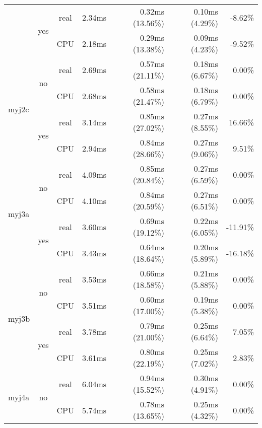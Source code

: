 \documentclass[en]{pracamgr}
\begin{document}
\begin{appendices}
\begin{small}
\begin{longtable}{|l|c|c|r|r|r|r|}
                          \cline{2-7}
                          & \multirow{2}{*}{yes} & real & 2.34ms & 0.32ms (13.56\%) & 0.10ms (4.29\%) & -8.62\% \\*
                          &                      & CPU  & 2.18ms & 0.29ms (13.38\%) & 0.09ms (4.23\%) & -9.52\% \\
\hline
\multirow{4}{*}{myj2c}    & \multirow{2}{*}{no}  & real & 2.69ms & 0.57ms (21.11\%) & 0.18ms (6.67\%) & 0.00\% \\*
                          &                      & CPU  & 2.68ms & 0.58ms (21.47\%) & 0.18ms (6.79\%) & 0.00\% \\*
                          \cline{2-7}
                          & \multirow{2}{*}{yes} & real & 3.14ms & 0.85ms (27.02\%) & 0.27ms (8.55\%) & 16.66\% \\*
                          &                      & CPU  & 2.94ms & 0.84ms (28.66\%) & 0.27ms (9.06\%) & 9.51\% \\
\hline
\multirow{4}{*}{myj3a}    & \multirow{2}{*}{no}  & real & 4.09ms & 0.85ms (20.84\%) & 0.27ms (6.59\%) & 0.00\% \\*
                          &                      & CPU  & 4.10ms & 0.84ms (20.59\%) & 0.27ms (6.51\%) & 0.00\% \\*
                          \cline{2-7}
                          & \multirow{2}{*}{yes} & real & 3.60ms & 0.69ms (19.12\%) & 0.22ms (6.05\%) & -11.91\% \\*
                          &                      & CPU  & 3.43ms & 0.64ms (18.64\%) & 0.20ms (5.89\%) & -16.18\% \\
\hline
\multirow{4}{*}{myj3b}    & \multirow{2}{*}{no}  & real & 3.53ms & 0.66ms (18.58\%) & 0.21ms (5.88\%) & 0.00\% \\*
                          &                      & CPU  & 3.51ms & 0.60ms (17.00\%) & 0.19ms (5.38\%) & 0.00\% \\*
                          \cline{2-7}
                          & \multirow{2}{*}{yes} & real & 3.78ms & 0.79ms (21.00\%) & 0.25ms (6.64\%) & 7.05\% \\*
                          &                      & CPU  & 3.61ms & 0.80ms (22.19\%) & 0.25ms (7.02\%) & 2.83\% \\
\hline
\multirow{4}{*}{myj4a}    & \multirow{2}{*}{no}  & real & 6.04ms & 0.94ms (15.52\%) & 0.30ms (4.91\%) & 0.00\% \\*
                          &                      & CPU  & 5.74ms & 0.78ms (13.65\%) & 0.25ms (4.32\%) & 0.00\% \\*

\end{longtable}
\end{small}
\end{appendices}
\end{document}
